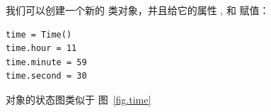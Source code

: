 我们可以创建一个新的  类对象，并且给它的属性  ,
 和  赋值：

\begin{lstlisting}
time = Time()
time.hour = 11
time.minute = 59
time.second = 30
\end{lstlisting}

%

 对象的状态图类似于 图~\ref{fig.time}

  
  


